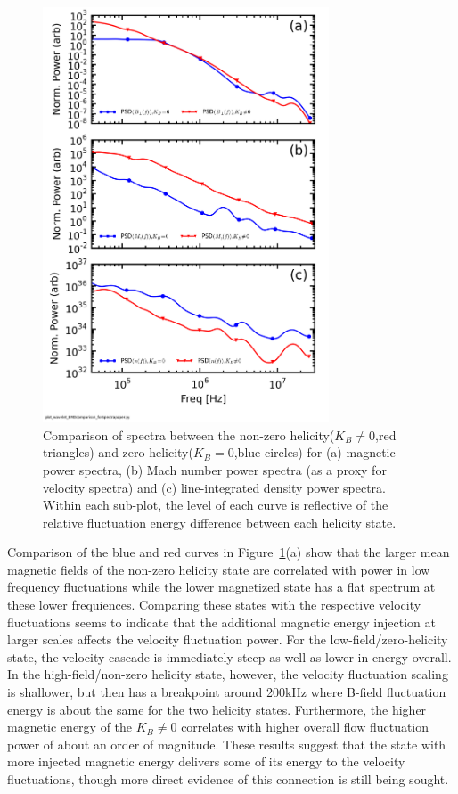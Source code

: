 \documentclass[aip,prl,amsmath,amssymb,reprint,superscriptaddress]{revtex4-1} %
\begin{document}
\begin{figure}[!htbp]
\centerline{
\includegraphics[width=8.5cm]{BvsFlowvsDensspec_2fluxes_separateplots_40t60us}}
\caption{\label{fig:BvsFlow} Comparison of spectra between the non-zero helicity($K_{B}\neq 0$,red triangles) and zero helicity($K_{B}=0$,blue circles) for (a) magnetic power spectra, (b) Mach number power spectra (as a proxy for velocity spectra) and (c) line-integrated density power spectra. Within each sub-plot, the level of each curve is reflective of the relative fluctuation energy difference between each helicity state.}
\end{figure}

Comparison of the blue and red curves in Figure~\ref{fig:BvsFlow}(a) show that the larger mean magnetic fields of the non-zero helicity state are correlated with power in low frequency fluctuations while the lower magnetized state has a flat spectrum at these lower frequiences. Comparing these states with the respective velocity fluctuations seems to indicate that the additional magnetic energy injection at larger scales affects the velocity fluctuation power. For the low-field/zero-helicity state, the velocity cascade is immediately steep as well as lower in energy overall. In the high-field/non-zero helicity state, however, the velocity fluctuation scaling is shallower, but then has a breakpoint around 200kHz where B-field fluctuation energy is about the same for the two helicity states. Furthermore, the higher magnetic energy of the $K_{B}\neq 0$ correlates with higher overall flow fluctuation power of about an order of magnitude. These results suggest that the state with more injected magnetic energy delivers some of its energy to the velocity fluctuations, though more direct evidence of this connection is still being sought.
\end{document}
